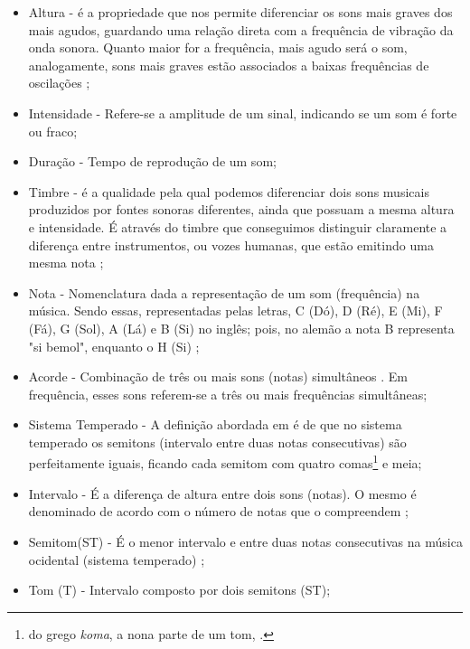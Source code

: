 \begin{itemize}
   \item Altura - é a propriedade que nos permite diferenciar os sons mais graves dos mais agudos, guardando uma relação direta com a frequência de vibração da onda sonora. Quanto maior for a frequência, mais agudo será o som, analogamente, sons mais graves estão associados a baixas frequências de oscilações \cite{med1996}; 
   \item Intensidade - Refere-se a amplitude de um sinal, indicando se um som é forte ou fraco;
   \item Duração - Tempo de reprodução de um som;
   \item Timbre - é a qualidade pela qual podemos diferenciar dois sons musicais produzidos por fontes sonoras diferentes, ainda que possuam a mesma altura e intensidade. É através do timbre que conseguimos distinguir claramente a diferença entre instrumentos, ou vozes humanas, que estão emitindo uma mesma nota \cite{moyses2002};  
   \item Nota - Nomenclatura dada a representação de um som (frequência) na música. Sendo essas, representadas pelas letras, C (Dó), D (Ré), E (Mi), F (Fá), G (Sol), A (Lá) e B (Si) no inglês; pois, no alemão a nota B representa "si bemol", enquanto o H (Si) \cite{med1996};
   \item Acorde - Combinação de três ou mais sons (notas) simultâneos \cite{med1996}. Em frequência, esses sons referem-se a três ou mais frequências simultâneas;
   \item Sistema Temperado - A definição abordada em  é de que no sistema temperado os semitons (intervalo entre duas notas consecutivas) são perfeitamente iguais, ficando cada semitom com quatro comas\footnote{do grego \textit{koma}, a nona parte de um tom, \cite[p. 31]{med1996}.} e meia;%
   \item Intervalo - É a diferença de altura entre dois sons  (notas). O mesmo é denominado de acordo com o número de notas que o compreendem \cite{med1996};
   \item Semitom(ST) - É o menor intervalo e entre duas notas consecutivas na música ocidental (sistema temperado) \cite{med1996};
   \item Tom (T) - Intervalo composto por dois semitons (ST);

\end{itemize}

